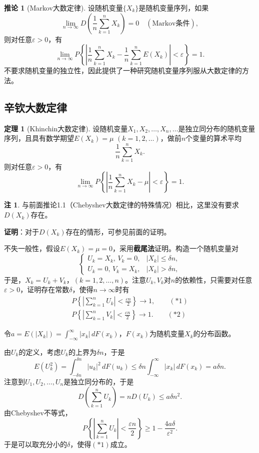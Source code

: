 \documentclass[11pt,a4paper]{report}
\theoremstyle{definition}
\newtheorem{note}{注}[chapter]
\newtheorem{theorem}{定理}[chapter]
\newtheorem{corollary}{推论}[chapter]
\begin{document}
\begin{corollary}[Markov大数定律]
设随机变量$\{X_{k}\}$是随机变量序列，如果
\[
\lim_{n\to\infty}D\left(\frac{1}{n}\sum_{k=1}^{n}X_{k}\right)=0\quad(\text{Markov条件}),
\]
则对任意$\varepsilon>0$，有
\[
\lim_{n\to\infty}P\left\{\left|\frac{1}{n}\sum_{k=1}^{n}X_{k}-\frac{1}{n}\sum_{k=1}^{n}E(X_{k})\right|<\varepsilon\right\}=1.
\]
不要求随机变量的独立性，因此提供了一种研究随机变量序列服从大数定律的方法。
\end{corollary}

\subsection{辛钦大数定律}

\begin{theorem}[Khinchin大数定律]
设随机变量$X_{1},X_{2},\ldots,X_{n},\ldots$是独立同分布的随机变量序列，且具有数学期望$E(X_{k})=\mu$ $(k=1,2,\ldots)$，做前$n$个变量的算术平均
\[
\frac{1}{n}\sum_{k=1}^{n}X_{k}.
\]
则对任意$\varepsilon>0$，有
\[
\lim_{n\to\infty}P\left\{\left|\frac{1}{n}\sum_{k=1}^{n}X_{k}-\mu\right|<\varepsilon\right\}=1.
\]
\end{theorem}

\begin{note}
与前面推论1.1（Chebyshev大数定律的特殊情况）相比，这里没有要求$D(X_{k})$存在。
\end{note}

\textbf{证明}：对于$D(X_{k})$存在的情形，可参见前面的证明。

不失一般性，假设$E(X_{k})=\mu=0$，采用\textbf{截尾法}证明。构造一个随机变量对
\[
\begin{cases}
U_{k}=X_{k},\,V_{k}=0, & |X_{k}|\leq\delta n,\\[0.3em]
U_{k}=0,\,V_{k}=X_{k}, & |X_{k}|>\delta n,
\end{cases}
\]
于是，$X_{k}=U_{k}+V_{k}$，$(k=1,2,\ldots,n)$。注意$U_{k},V_{k}$对$n$的依赖性，只需要对任意$\varepsilon>0$，证明存在常数$\delta$，使得$n\to\infty$时有
\begin{align*}
P\left\{\left|\sum_{k=1}^{n}U_{k}\right|<\frac{\varepsilon n}{2}\right\}\to1,\qquad(*1)\\[0.3em]
P\left\{\left|\sum_{k=1}^{n}V_{k}\right|<\frac{\varepsilon n}{2}\right\}\to1.\qquad(*2)
\end{align*}

令$a=E(|X_{k}|)=\int_{-\infty}^{\infty}|x_{k}|\,dF(x_{k})$，$F(x_{k})$为随机变量$X_{k}$的分布函数。

由$U_{k}$的定义，考虑$U_{k}$的上界为$\delta n$，于是
\[
E(U_{k}^{2})=\int_{-\delta n}^{\delta n}|u_{k}|^{2}\,dF(u_{k})\leq\delta n\int_{-\infty}^{\infty}|x_{k}|\,dF(x_{k})=a\delta n.
\]
注意到$U_{1},U_{2},\ldots,U_{n}$是独立同分布的，于是
\[
D\left(\sum_{k=1}^{n}U_{k}\right)=nD(U_{k})\leq a\delta n^{2}.
\]
由Chebyshev不等式，
\[
P\left\{\left|\sum_{k=1}^{n}U_{k}\right|<\frac{\varepsilon n}{2}\right\}\geq1-\frac{4a\delta}{\varepsilon^{2}}.
\]
于是可以取充分小的$\delta$，使得$(*1)$成立。
\end{document}
